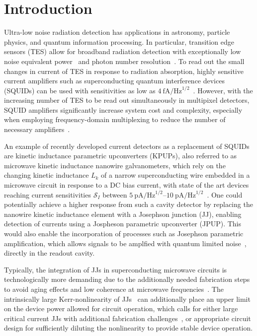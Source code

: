 \section{Introduction}

Ultra-low noise radiation detection has applications in astronomy, particle physics, and quantum information processing.
% 
In particular, transition edge sensors (TES) allow for broadband radiation detection with exceptionally low noise equivalent power~\cite{goldieUltralownoiseMoCuTransition2011} and photon number resolution~\cite{cabreraDetectionSingleInfrared1998,millerDemonstrationLownoiseNearinfrared2003}.
% 
To read out the small changes in current of TES in response to radiation absorption, highly sensitive current amplifiers such as superconducting quantum interference devices (SQUIDs) can be used with sensitivities as low as $\SI{4}{\femto\ampere\per\hertz\tothe{1/2}}$~\cite{gayUltralowNoiseCurrent2000}.
% 
However, with the increasing number of TES to be read out simultaneously in multipixel detectors, SQUID amplifiers significantly increase system cost and complexity, especially when employing frequency-domain multiplexing to reduce the number of necessary amplifiers~\cite{hendersonReadoutTwokilopixelTransitionedge2016}.

An example of recently developed current detectors as a replacement of SQUIDs are kinetic inductance parametric upconverters (KPUPs), also referred to as microwave kinetic inductance nanowire galvanometers, which rely on the changing kinetic inductance $L_k$ of a narrow superconducting wire embedded in a microwave circuit in response to a DC bias current, with state of the art devices reaching current sensitivities $\mathcal{S}_I$ between $\SIrange{5}{10}{\pico\ampere\per\hertz\tothe{1/2}}$~\cite{kherKineticInductanceParametric2016,doernerCompactMicrowaveKinetic2018,kuzminTerahertzTransitionEdgeSensor2018}.
%
One could potentially achieve a higher response from such a cavity detector by replacing the nanowire kinetic inductance element with a Josephson junction (JJ), enabling detection of currents using a Jospheson parametric upconverter (JPUP). 
% 
This would also enable the incorporation of processes such as Josephson parametric amplification, which allows signals to be amplfied with quantum limited noise~\cite{stehlikFastChargeSensing2015}, directly in the readout cavity.

Typically, the integration of JJs in superconducting microwave circuits is technologically more demanding due to the additionally needed fabrication steps to avoid aging effects and low coherence at microwave frequencies~\cite{pavolotskyAgingAnnealinginducedVariations2011,gotetiReliabilityStudiesNb2019,gunnarssonDielectricLossesMultilayer2013,yanaiObservationEnhancedCoherence2019}.
% 
The intrinsically large Kerr-nonlinearity of JJs~\cite{wallraffStrongCouplingSingle2004e} can additionally place an upper limit on the device power allowed for circuit operation, which calls for either large critical current JJs with additional fabrication challenges~\cite{lecocqJunctionFabricationShadow2011b}, or appropriate circuit design for sufficiently diluting the nonlinearity to provide stable device operation.

